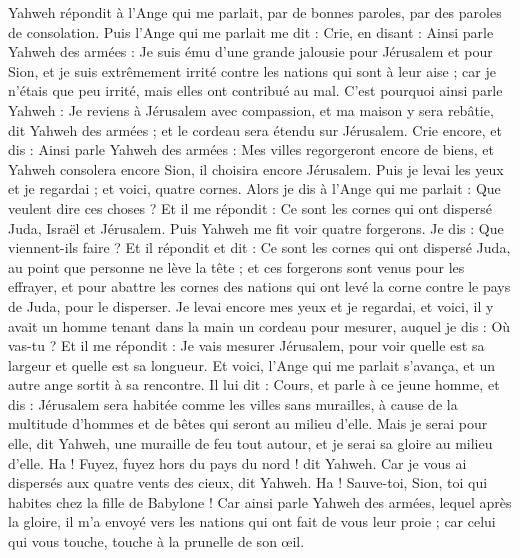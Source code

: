\begin{multicols}{2}
Yahweh répondit à l'Ange qui me parlait, par de bonnes paroles, par des paroles de consolation.
Puis l'Ange qui me parlait me dit : Crie, en disant : Ainsi parle Yahweh des armées : Je suis ému d'une grande jalousie pour Jérusalem et pour Sion,
et je suis extrêmement irrité contre les nations qui sont à leur aise ; car je n’étais que peu irrité, mais elles ont contribué au mal.
C'est pourquoi ainsi parle Yahweh : Je reviens à Jérusalem avec compassion, et ma maison y sera rebâtie, dit Yahweh des armées ; et le cordeau sera étendu sur Jérusalem.
Crie encore, et dis : Ainsi parle Yahweh des armées : Mes villes regorgeront encore de biens, et Yahweh consolera encore Sion, il choisira encore Jérusalem.
Puis je levai les yeux et je regardai ; et voici, quatre cornes.
Alors je dis à l'Ange qui me parlait : Que veulent dire ces choses ? Et il me répondit : Ce sont les cornes qui ont dispersé Juda, Israël et Jérusalem.
Puis Yahweh me fit voir quatre forgerons.
Je dis : Que viennent-ils faire ? Et il répondit et dit : Ce sont les cornes qui ont dispersé Juda, au point que personne ne lève la tête ; et ces forgerons sont venus pour les effrayer, et pour abattre les cornes des nations qui ont levé la corne contre le pays de Juda, pour le disperser.
\VerseOne{}Je levai encore mes yeux et je regardai, et voici, il y avait un homme tenant dans la main un cordeau pour mesurer,
auquel je dis : Où vas-tu ? Et il me répondit : Je vais mesurer Jérusalem, pour voir quelle est sa largeur et quelle est sa longueur.
Et voici, l'Ange qui me parlait s’avança, et un autre ange sortit à sa rencontre.
Il lui dit : Cours, et parle à ce jeune homme, et dis : Jérusalem sera habitée comme les villes sans murailles, à cause de la multitude d'hommes et de bêtes qui seront au milieu d'elle.
Mais je serai pour elle, dit Yahweh, une muraille de feu tout autour, et je serai sa gloire au milieu d'elle.
Ha ! Fuyez, fuyez hors du pays du nord ! dit Yahweh. Car je vous ai dispersés aux quatre vents des cieux, dit Yahweh.
Ha ! Sauve-toi, Sion, toi qui habites chez la fille de Babylone !
Car ainsi parle Yahweh des armées, lequel après la gloire, il m'a envoyé vers les nations qui ont fait de vous leur proie ; car celui qui vous touche, touche à la prunelle de son œil.

\end{multicols}
